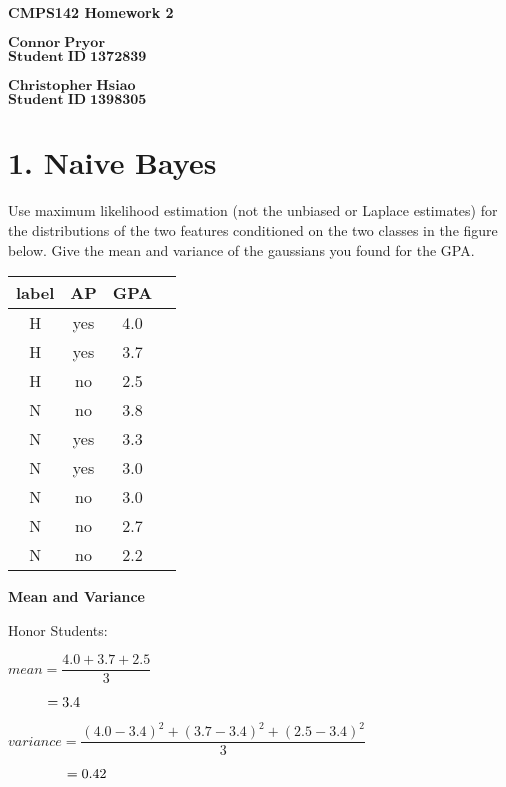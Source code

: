 \documentclass[11pt]{article}
\begin{document}
\begin{center}
{\bf\Large CMPS142 Homework 2}
\end{center}
\noindent $\mathbf{Connor\;Pryor}$\\
\noindent $\mathbf{Student\;ID\;1372839}$\\
\\
\noindent $\mathbf{Christopher\;Hsiao}$\\
\noindent $\mathbf{Student\;ID\;1398305}$\\

\section*{1. Naive Bayes}
Use maximum likelihood estimation (not the unbiased or Laplace estimates) for the distributions of the two features conditioned on the two classes in the figure below. Give the mean and variance of the gaussians you found for the GPA.\newline
\begin{center}
\begin{tabular}{ |c|c|c|c| } 
\hline
label & AP & GPA \\
\hline

H & yes & 4.0 \\ 
H & yes & 3.7 \\ 
H & no & 2.5 \\ 
N & no & 3.8 \\ 
N & yes & 3.3 \\ 
N & yes & 3.0 \\ 
N & no & 3.0 \\ 
N & no & 2.7 \\ 
N & no & 2.2 \\
\hline
\end{tabular}
\end{center}

\noindent \textbf{Mean and Variance}\newline

\noindent Honor Students:\newline

$mean = \dfrac{4.0+3.7+2.5}{3}$\newline

$\hphantom{mean }= 3.4$\newline

$variance = \dfrac{(4.0-3.4)^2 + (3.7-3.4)^2 + (2.5-3.4)^2}{3} $\newline

$\hphantom{variance }= 0.42$\newline
\end{document}
